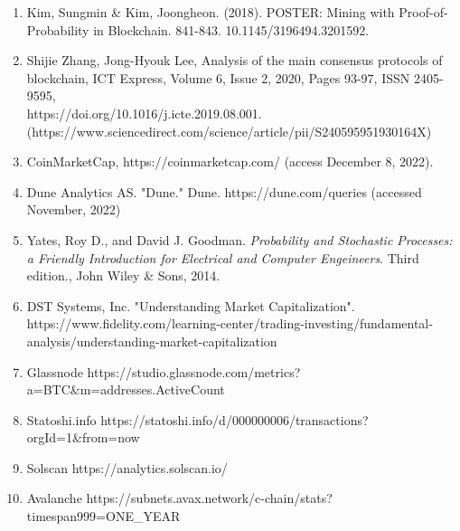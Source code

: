 \documentclass[12pt]{article}
\begin{document}
\begin{enumerate}
	\item Kim, Sungmin \& Kim, Joongheon. (2018). POSTER: Mining with Proof-of-Probability in Blockchain. 841-843. 10.1145/3196494.3201592. 
     \item Shijie Zhang, Jong-Hyouk Lee, Analysis of the main consensus protocols of blockchain, ICT Express, Volume 6, Issue 2, 2020, Pages 93-97, ISSN 2405-9595, \\https://doi.org/10.1016/j.icte.2019.08.001. \\(https://www.sciencedirect.com/science/article/pii/S240595951930164X)
	\item CoinMarketCap, https://coinmarketcap.com/ (access December 8, 2022).
	\item Dune Analytics AS. "Dune." Dune. https://dune.com/queries (accessed November, 2022)
	\item Yates, Roy D., and David J. Goodman. \emph{Probability and Stochastic Processes: a Friendly Introduction for Electrical and Computer Engeineers}. Third edition., John Wiley \& Sons, 2014.
	\item DST Systems, Inc. "Understanding Market Capitalization". https://www.fidelity.com/learning-center/trading-investing/fundamental-analysis/understanding-market-capitalization
	\item Glassnode https://studio.glassnode.com/metrics?a=BTC\&m=addresses.ActiveCount
	\item Statoshi.info https://statoshi.info/d/000000006/transactions?orgId=1\&from=now%
	\item Solscan https://analytics.solscan.io/
	\item Avalanche https://subnets.avax.network/c-chain/stats?timespan999=ONE\_YEAR
\end{enumerate}
\end{document}
